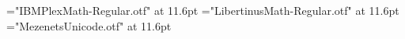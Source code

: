 \begingroup
\font\slfigPBaseMath="IBMPlexMath-Regular.otf" at 11.6pt
\font\slfigPBinaryMath="LibertinusMath-Regular.otf" at 11.6pt
\font\slfigPTotalMath="MezenetsUnicode.otf" at 11.6pt
\def\slfigPAlpha{\mathord{\hbox{\slfigPBaseMath\char"1D6FC}}}
\def\slfigPCountN{\mathord{\hbox{\slfigPBaseMath\char"1D45B}}}
\def\slfigPPlus{\mathbin{\hbox{\slfigPBinaryMath\char"002B}}}
\def\slfigPTotalN{\mathord{\hbox{\slfigPTotalMath\char"004E}}}
